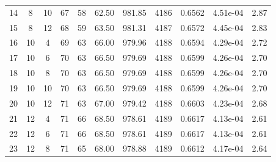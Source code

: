 {\begin{longtable}{|c|c|c|c|c|c|c|c|c|c|c|}
            14           & 8              & 10             & 67                  & 58                   & 62.50                & 981.85            & 4186               & 0.6562               & 4.51e-04         & 2.87            \\
            15           & 8              & 12             & 68                  & 59                   & 63.50                & 981.31            & 4187               & 0.6572               & 4.45e-04         & 2.83            \\ \hline
            16           & 10             & 4              & 69                  & 63                   & 66.00                & 979.96            & 4188               & 0.6594               & 4.29e-04         & 2.72            \\
            17           & 10             & 6              & 70                  & 63                   & 66.50                & 979.69            & 4188               & 0.6599               & 4.26e-04         & 2.70            \\
            18           & 10             & 8              & 70                  & 63                   & 66.50                & 979.69            & 4188               & 0.6599               & 4.26e-04         & 2.70            \\
            19           & 10             & 10             & 70                  & 63                   & 66.50                & 979.69            & 4188               & 0.6599               & 4.26e-04         & 2.70            \\
            20           & 10             & 12             & 71                  & 63                   & 67.00                & 979.42            & 4188               & 0.6603               & 4.23e-04         & 2.68            \\ \hline
            21           & 12             & 4              & 71                  & 66                   & 68.50                & 978.61            & 4189               & 0.6617               & 4.13e-04         & 2.61            \\
            22           & 12             & 6              & 71                  & 66                   & 68.50                & 978.61            & 4189               & 0.6617               & 4.13e-04         & 2.61            \\
            23           & 12             & 8              & 71                  & 65                   & 68.00                & 978.88            & 4189               & 0.6612               & 4.17e-04         & 2.64            \\

\end{longtable}}
